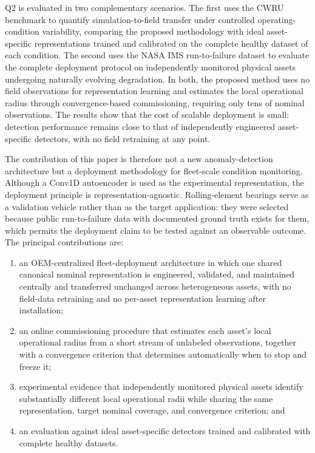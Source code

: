 \documentclass[numbered]{trbunofficial}
\begin{document}
Q2 is evaluated in two complementary scenarios. The first uses the CWRU \citep{smith2015}
benchmark to quantify simulation-to-field transfer under controlled operating-condition
variability, comparing the proposed methodology with ideal asset-specific representations trained
and calibrated on the complete healthy dataset of each condition. The second uses the NASA IMS
run-to-failure dataset to evaluate the complete deployment protocol on independently monitored
physical assets undergoing naturally evolving degradation. In both, the proposed method uses no
field observations for representation learning and estimates the local operational radius through
convergence-based commissioning, requiring only tens of nominal observations. The results show
that the cost of scalable deployment is small: detection performance remains close to that of
independently engineered asset-specific detectors, with no field retraining at any point.

The contribution of this paper is therefore not a new anomaly-detection architecture but a
deployment methodology for fleet-scale condition monitoring. Although a Conv1D autoencoder is
used as the experimental representation, the deployment principle is representation-agnostic.
Rolling-element bearings serve as a validation vehicle rather than as the target application: they
were selected because public run-to-failure data with documented ground truth exists for them,
which permits the deployment claim to be tested against an observable outcome. The principal
contributions are:

\begin{enumerate}[leftmargin=1.5em]
\item an OEM-centralized fleet-deployment architecture in which one shared canonical nominal
representation is engineered, validated, and maintained centrally and transferred unchanged across
heterogeneous assets, with no field-data retraining and no per-asset representation learning after
installation;

\item an online commissioning procedure that estimates each asset's local operational radius from
a short stream of unlabeled observations, together with a convergence criterion that determines
automatically when to stop and freeze it;

\item experimental evidence that independently monitored physical assets identify substantially
different local operational radii while sharing the same representation, target nominal coverage,
and convergence criterion; and

\item an evaluation against ideal asset-specific detectors trained and calibrated with complete
healthy datasets.
\end{enumerate}
\end{document}
